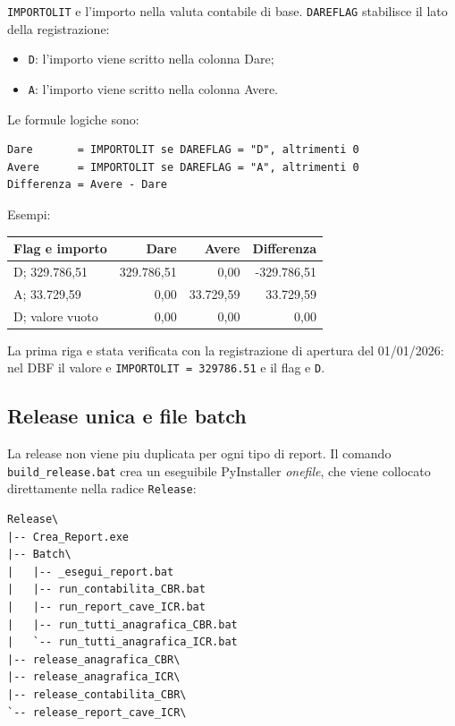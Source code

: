 \texttt{IMPORTOLIT} e l'importo nella valuta contabile di base.
\texttt{DAREFLAG} stabilisce il lato della registrazione:

\begin{itemize}
  \item \texttt{D}: l'importo viene scritto nella colonna Dare;
  \item \texttt{A}: l'importo viene scritto nella colonna Avere.
\end{itemize}

Le formule logiche sono:

\begin{lstlisting}
Dare       = IMPORTOLIT se DAREFLAG = "D", altrimenti 0
Avere      = IMPORTOLIT se DAREFLAG = "A", altrimenti 0
Differenza = Avere - Dare
\end{lstlisting}

Esempi:

\begin{center}
\begin{tabular}{lrrr}
\hline
\textbf{Flag e importo} & \textbf{Dare} & \textbf{Avere} &
\textbf{Differenza} \\
\hline
D; 329.786,51 & 329.786,51 & 0,00 & -329.786,51 \\
A; 33.729,59  & 0,00 & 33.729,59 & 33.729,59 \\
D; valore vuoto & 0,00 & 0,00 & 0,00 \\
\hline
\end{tabular}
\end{center}

La prima riga e stata verificata con la registrazione di apertura del
01/01/2026: nel DBF il valore e \texttt{IMPORTOLIT = 329786.51} e il flag e
\texttt{D}.

\subsection{Release unica e file batch}

La release non viene piu duplicata per ogni tipo di report. Il comando
\texttt{build\_release.bat} crea un eseguibile PyInstaller \emph{onefile}, che
viene collocato direttamente nella radice \texttt{Release}:

\begin{lstlisting}
Release\
|-- Crea_Report.exe
|-- Batch\
|   |-- _esegui_report.bat
|   |-- run_contabilita_CBR.bat
|   |-- run_report_cave_ICR.bat
|   |-- run_tutti_anagrafica_CBR.bat
|   `-- run_tutti_anagrafica_ICR.bat
|-- release_anagrafica_CBR\
|-- release_anagrafica_ICR\
|-- release_contabilita_CBR\
`-- release_report_cave_ICR\
\end{lstlisting}

